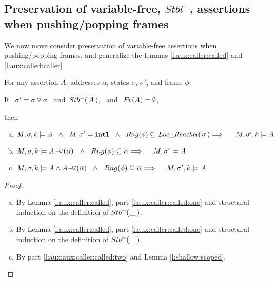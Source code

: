 \subsection{Preservation of variable-free, $Stbl^+$, assertions when   pushing/popping frames}
We now move consider preservation of variable-free assertions when pushing/popping frames, and generalize the lemmas  \ref{l:aux:caller:called} and
 \ref{l:aux:called:caller}

\begin{lemma}
\label{l:aux:aux:caller:called}

For any assertion $A$,  addresses $\overline \alpha$, states $\sigma$, $\sigma'$,  and frame $\phi$.

\noindent
If \   $\sigma'=\sigma  \, {\triangledown}\, \phi $ \  and\  ${Stb^+(\, A\, )}$, \ and \  ${\hspace{-1pt}F\hspace{-1pt}}v(A)=\emptyset$,

\noindent
then

\begin{enumerate}[a.]
\label{l:aux:aux:caller:called:one}
\item
$ \satDAssertFrom M  \sigma k    A \ \ \wedge \ \  
  M, \sigma' \models \intThis\ \ \wedge \ \  Rng(\phi) \subseteq  \LRelevantO \sigma
  \hfill \Longrightarrow  \ \ \  \   \ \satDAssertFrom M  {\sigma'} k   A $

\item
\label{l:aux:aux:caller:called:two}
$\satDAssertFrom M  \sigma k    {\PushASLong  {(\overline {\alpha})} {A}}    \ \ \wedge \ \  Rng(\phi) \subseteq   {\overline \alpha}  
 \hfill \Longrightarrow  \ \ \  \    M,  {\sigma'} \models   {A}$

\item
\label{l:aux:aux:caller:called:three}
$\satDAssertFrom M  \sigma k    {A \wedge   {\PushASLong  {(\overline {\alpha})} {A}} }    \ \ \wedge \ \  Rng(\phi) \subseteq    {\overline \alpha} 
 \hfill \Longrightarrow  \ \ \  \   \satDAssertFrom M  {\sigma'} k  {A}$

\end{enumerate}

\end{lemma}

\begin{proof} $ ~ $ %

\begin{enumerate}[a.]
 
\item
By Lemma \ref{l:aux:caller:called}, part \ref{l:aux:caller:called:one}  and structural induction on the definition of ${Stb^+(\, \_\, )}$.
\item
By Lemma \ref{l:aux:caller:called}, part \ref{l:aux:caller:called:one}  and structural induction on the definition of ${Stb^+(\, \_\, )}$.
\item 
By part   \ref{l:aux:aux:caller:called:two} and Lemma  \ref{l:shallow:scoped}.
\end{enumerate}
 
\end{proof}


